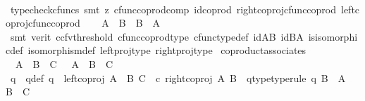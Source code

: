 \begin{isabellebody}
\ \ \ \ \isamarkupfalse%
\ {\isacharparenleft}{\kern0pt}typecheck{\isacharunderscore}{\kern0pt}cfuncs{\isacharcomma}{\kern0pt}\ smt\ {\isacharparenleft}{\kern0pt}z{}{\isacharparenright}{\kern0pt}\ cfunc{\isacharunderscore}{\kern0pt}coprod{\isacharunderscore}{\kern0pt}comp\ id{\isacharunderscore}{\kern0pt}coprod\ right{\isacharunderscore}{\kern0pt}coproj{\isacharunderscore}{\kern0pt}cfunc{\isacharunderscore}{\kern0pt}coprod\ left{\isacharunderscore}{\kern0pt}coproj{\isacharunderscore}{\kern0pt}cfunc{\isacharunderscore}{\kern0pt}coprod{\isacharparenright}{\kern0pt}\isanewline
\ \ \isamarkupfalse%
\ {\isachardoublequoteopen}A\ {\isasymCoprod}\ B\ {\isasymcong}\ B\ {\isasymCoprod}\ A{\isachardoublequoteclose}\isanewline
\ \ \ \ \isamarkupfalse%
\ {\isacharparenleft}{\kern0pt}smt\ {\isacharparenleft}{\kern0pt}verit{\isacharcomma}{\kern0pt}\ ccfv{\isacharunderscore}{\kern0pt}threshold{\isacharparenright}{\kern0pt}\ cfunc{\isacharunderscore}{\kern0pt}coprod{\isacharunderscore}{\kern0pt}type\ cfunc{\isacharunderscore}{\kern0pt}type{\isacharunderscore}{\kern0pt}def\ id{\isacharunderscore}{\kern0pt}AB\ id{\isacharunderscore}{\kern0pt}BA\ is{\isacharunderscore}{\kern0pt}isomorphic{\isacharunderscore}{\kern0pt}def\ isomorphism{\isacharunderscore}{\kern0pt}def\ left{\isacharunderscore}{\kern0pt}proj{\isacharunderscore}{\kern0pt}type\ right{\isacharunderscore}{\kern0pt}proj{\isacharunderscore}{\kern0pt}type{\isacharparenright}{\kern0pt}\isanewline
{}\isamarkupfalse%
%
\endisatagproof
{\isafoldproof}%
%
\isadelimproof
\isanewline
%
\endisadelimproof
\isanewline
{}\isamarkupfalse%
\ coproduct{\isacharunderscore}{\kern0pt}associates{\isacharcolon}{\kern0pt}\isanewline
\ \ {\isachardoublequoteopen}A\ {\isasymCoprod}\ {\isacharparenleft}{\kern0pt}B\ {\isasymCoprod}\ C{\isacharparenright}{\kern0pt}\ \ {\isasymcong}\ {\isacharparenleft}{\kern0pt}A\ {\isasymCoprod}\ B{\isacharparenright}{\kern0pt}\ {\isasymCoprod}\ C{\isachardoublequoteclose}\isanewline
%
\isadelimproof
%
\endisadelimproof
%
\isatagproof
{}\isamarkupfalse%
\ {\isacharminus}{\kern0pt}\isanewline
\ \ \isamarkupfalse%
\ q\ \ q{\isacharunderscore}{\kern0pt}def{\isacharcolon}{\kern0pt}\ {\isachardoublequoteopen}q\ {\isacharequal}{\kern0pt}\ {\isacharparenleft}{\kern0pt}left{\isacharunderscore}{\kern0pt}coproj\ {\isacharparenleft}{\kern0pt}A\ {\isasymCoprod}\ B{\isacharparenright}{\kern0pt}\ C\ {\isacharparenright}{\kern0pt}\ {\isasymcirc}\isactrlsub c\ {\isacharparenleft}{\kern0pt}right{\isacharunderscore}{\kern0pt}coproj\ A\ B{\isacharparenright}{\kern0pt}{\isachardoublequoteclose}\ \ q{\isacharunderscore}{\kern0pt}type{\isacharbrackleft}{\kern0pt}type{\isacharunderscore}{\kern0pt}rule{\isacharbrackright}{\kern0pt}{\isacharcolon}{\kern0pt}\ {\isachardoublequoteopen}q{\isacharcolon}{\kern0pt}\ B\ {\isasymrightarrow}\ {\isacharparenleft}{\kern0pt}A\ {\isasymCoprod}\ B{\isacharparenright}{\kern0pt}\ {\isasymCoprod}\ C{\isachardoublequoteclose}\isanewline

\end{isabellebody}
